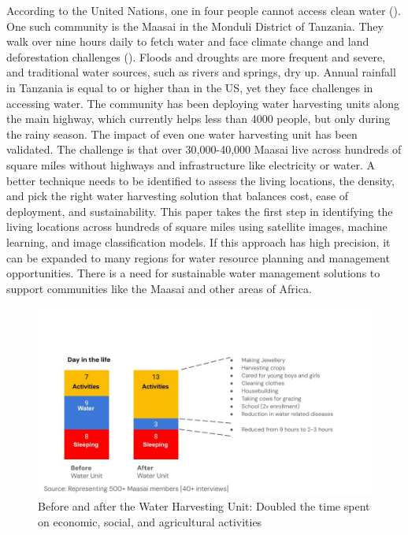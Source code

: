 \documentclass[10pt]{article}
\begin{document}
According to the United Nations, one in four people cannot access clean water (\autocite{United_Nations}). One such community is the Maasai in the Monduli District of Tanzania. They walk over nine hours daily to fetch water and face climate change and land deforestation challenges (\autocite{taneja2024impact}). Floods and droughts are more frequent and severe, and traditional water sources, such as rivers and springs, dry up. Annual rainfall in Tanzania is equal to or higher than in the US, yet they face challenges in accessing water. The community has been deploying water harvesting units along the main highway, which currently helps less than 4000 people, but only during the rainy season. The impact of even one water harvesting unit has been validated. The challenge is that over 30,000-40,000 Maasai live across hundreds of square miles without highways and infrastructure like electricity or water. A better technique needs to be identified to assess the living locations, the density, and pick the right water harvesting solution that balances cost, ease of deployment, and sustainability. This paper takes the first step in identifying the living locations across hundreds of square miles using satellite images, machine learning, and image classification models. If this approach has high precision, it can be expanded to many regions for water resource planning and management opportunities.  There is a need for sustainable water management solutions to support communities like the Maasai and other areas of Africa.

\begin{figure} [H]
    \centering
    \includegraphics[width=1\linewidth]{images/beforeandafterwhu.jpg}
    \caption{Before and after the Water Harvesting Unit: Doubled the time spent on economic, social, and agricultural activities}
    \label{fig:bef_aft_results}
\end{figure}
\end{document}

